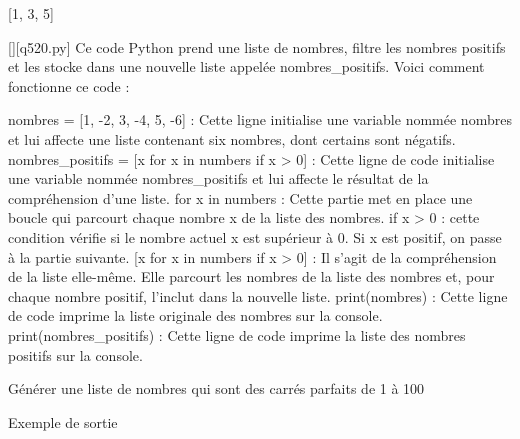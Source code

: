 [1, 3, 5]
        \par
        \begin{solution}
            \renewcommand{\nomfichier}{q520.py}
            \pythonfile{\chemincode \nomfichier}[][\nomfichier]
            Ce code Python prend une liste de nombres, filtre les nombres positifs et les stocke dans une nouvelle liste appelée nombres\_positifs. Voici comment fonctionne ce code :

    nombres = [1, -2, 3, -4, 5, -6] : Cette ligne initialise une variable nommée nombres et lui affecte une liste contenant six nombres, dont certains sont négatifs.
    nombres\_positifs = [x for x in numbers if x > 0] : Cette ligne de code initialise une variable nommée nombres\_positifs et lui affecte le résultat de la compréhension d'une liste.
        for x in numbers : Cette partie met en place une boucle qui parcourt chaque nombre x de la liste des nombres.
        if x > 0 : cette condition vérifie si le nombre actuel x est supérieur à 0. Si x est positif, on passe à la partie suivante.
        [x for x in numbers if x > 0] : Il s'agit de la compréhension de la liste elle-même. Elle parcourt les nombres de la liste des nombres et, pour chaque nombre positif, l'inclut dans la nouvelle liste.
    print(nombres) : Cette ligne de code imprime la liste originale des nombres sur la console.
    print(nombres\_positifs) : Cette ligne de code imprime la liste des nombres positifs sur la console.
        \end{solution}
        

        \question
        Générer une liste de nombres qui sont des carrés parfaits de 1 à 100

Exemple de sortie

